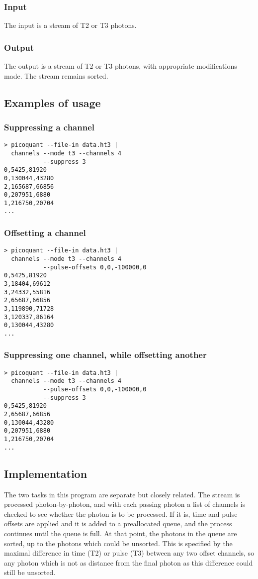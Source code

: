 \subsubsection{Input}
The input is a stream of T2 or T3 photons.

\subsubsection{Output}
The output is a stream of T2 or T3 photons, with appropriate modifications made. The stream remains sorted.

\subsection{Examples of usage}
\subsubsection{Suppressing a channel}
\begin{verbatim}
> picoquant --file-in data.ht3 |
  channels --mode t3 --channels 4 
           --suppress 3
0,5425,81920
0,130044,43280
2,165687,66856
0,207951,6880
1,216750,20704
...
\end{verbatim}

\subsubsection{Offsetting a channel}
\begin{verbatim}
> picoquant --file-in data.ht3 |
  channels --mode t3 --channels 4 
           --pulse-offsets 0,0,-100000,0
0,5425,81920
3,18404,69612
3,24332,55816
2,65687,66856
3,119890,71728
3,120337,86164
0,130044,43280
...
\end{verbatim}

\subsubsection{Suppressing one channel, while offsetting another}
\begin{verbatim}
> picoquant --file-in data.ht3 |
  channels --mode t3 --channels 4 
           --pulse-offsets 0,0,-100000,0
           --suppress 3
0,5425,81920
2,65687,66856
0,130044,43280
0,207951,6880
1,216750,20704
...
\end{verbatim}

\subsection{Implementation}
The two tasks in this program are separate but closely related. The stream is processed photon-by-photon, and with each passing photon a list of channels is checked to see whether the photon is to be processed. If it is, time and pulse offsets are applied and it is added to a preallocated queue, and the process continues until the queue is full. At that point, the photons in the queue are sorted, up to the photons which could be unsorted. This is specified by the maximal difference in time (T2) or pulse (T3) between any two offset channels, so any photon which is not as distance from the final photon as this difference could still be unsorted. 

